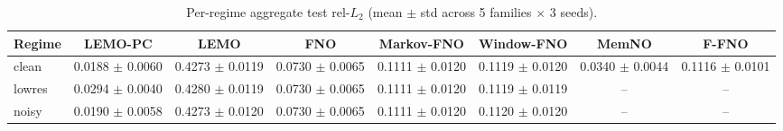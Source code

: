 \begin{table}[h]
\centering
\caption{Per-regime aggregate test rel-$L_2$ (mean $\pm$ std across 5 families $\times$ 3 seeds).}
\label{tab:perregime}
\begin{tabular}{lccccccc}
\toprule
Regime & \textbf{LEMO-PC} & LEMO & FNO & Markov-FNO & Window-FNO & MemNO & F-FNO \\
\midrule
clean & 0.0188 $\pm$ 0.0060 & 0.4273 $\pm$ 0.0119 & 0.0730 $\pm$ 0.0065 & 0.1111 $\pm$ 0.0120 & 0.1119 $\pm$ 0.0120 & 0.0340 $\pm$ 0.0044 & 0.1116 $\pm$ 0.0101 \\
lowres & 0.0294 $\pm$ 0.0040 & 0.4280 $\pm$ 0.0119 & 0.0730 $\pm$ 0.0065 & 0.1111 $\pm$ 0.0120 & 0.1119 $\pm$ 0.0119 & -- & -- \\
noisy & 0.0190 $\pm$ 0.0058 & 0.4273 $\pm$ 0.0120 & 0.0730 $\pm$ 0.0065 & 0.1111 $\pm$ 0.0120 & 0.1120 $\pm$ 0.0120 & -- & -- \\
\bottomrule
\end{tabular}
\end{table}
